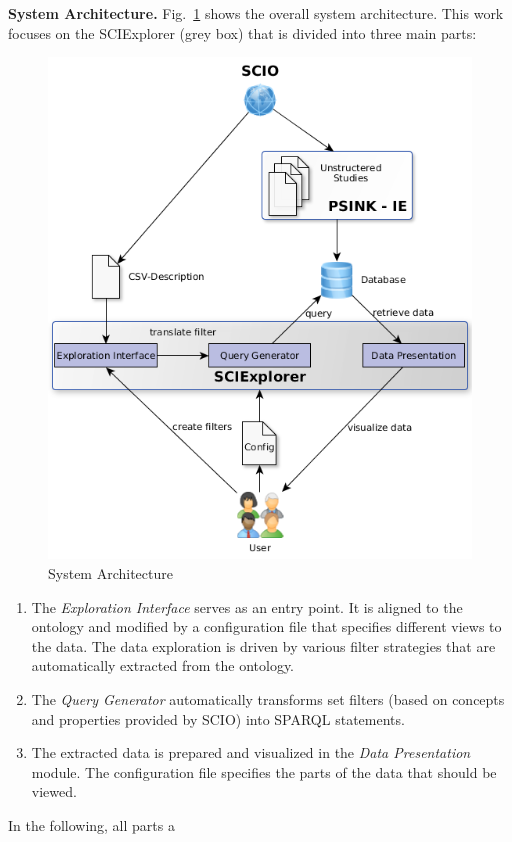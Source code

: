 \documentclass[runningheads,a4paper]{llncs}
\makeatletter
\def\maxwidth#1{\ifdim\Gin@nat@width>#1 #1\else\Gin@nat@width\fi}
\makeatother
\begin{document}
{\bf System Architecture. }Fig.~\ref{refFigure0} shows the overall system architecture. This work focuses on the SCIExplorer (grey box) that is divided into three main parts:
\begin{figure}[h!]
\centering
\includegraphics[width=\maxwidth{\textwidth}]{img/100002010000021E00000282A9ECCEA52E89BA7E.png}
\cprotect\caption{System Architecture}
\label{refFigure0}
\end{figure}

\begin{enumerate}
\item The {\em Exploration Interface} serves as an entry point. It is aligned to the ontology and modified by a configuration file that specifies different views to the data. The data exploration is driven by various filter strategies that are automatically extracted from the ontology.
\item The {\em Query Generator} automatically transforms set filters (based on concepts and properties provided by SCIO) into SPARQL statements.
\item The extracted data is prepared and visualized in the {\em Data Presentation} module. The configuration file specifies the parts of the data that should be viewed. 
\end{enumerate}

In the following, all parts a
\end{document}
